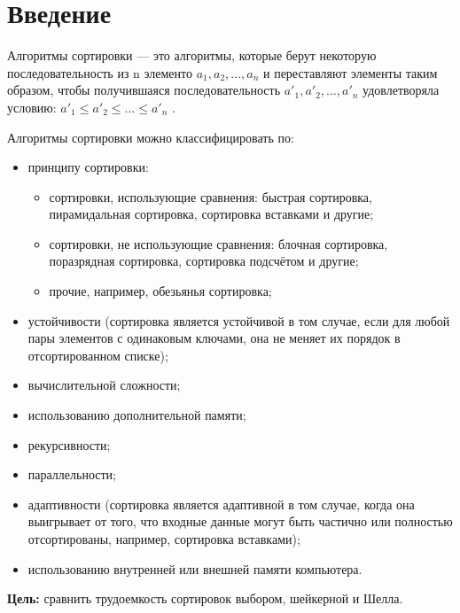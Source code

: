 \documentclass[12pt]{report}
\begin{document}
    
    \tableofcontents

    \newpage

    \chapter*{Введение}
    
    Алгоритмы сортировки — это алгоритмы, которые берут некоторую последовательность из n элементо
    $a_1, a_2,..., a_n$ и переставляют элементы таким образом,
    чтобы получившаяся последовательность $a'_1,a'_2,...,a'_n$ удовлетворяла условию:
    $a'_1 \leqslant a'_2 \leqslant ... \leqslant a'_n$ \cite{SortAlgorithms}.
    
    Алгоритмы сортировки можно классифицировать по:
    \begin{itemize}
    	\item принципу сортировки:
    	\begin{itemize}
    		\item сортировки, использующие сравнения:
    		быстрая сортировка, пирамидальная сортировка, сортировка вставками и другие;
    		\item сортировки, не использующие сравнения:
    		блочная сортировка, поразрядная сортировка, сортировка подсчётом и другие;
    		\item прочие, например, обезьянья сортировка;
    	\end{itemize}
    	\item устойчивости (сортировка является устойчивой в том случае,
    	если для любой пары элементов с одинаковым ключами,
    	она не меняет их порядок в отсортированном списке);
    	\item вычислительной сложности;
    	\item использованию дополнительной памяти;
    	\item рекурсивности;
    	\item параллельности;
    	\item адаптивности (сортировка является адаптивной в том случае,
    	когда она выигрывает от того, что входные данные могут быть частично или полностью отсортированы,
    	например, сортировка вставками);
    	\item использованию внутренней или внешней памяти компьютера.
    \end{itemize}
    
    \textbf{Цель:} сравнить трудоемкость сортировок выбором, шейкерной и Шелла.
\end{document}
